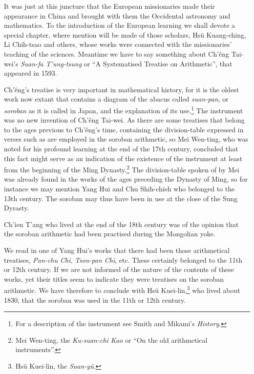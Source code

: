 \documentclass[11pt]{article}
\newcommand{\scanpage}[2]{\clearpage\setcounter{footnote}{0}\noindent{\footnotesize\color{gray}PDF page #1 · #2}\par\medskip}
\newcommand{\scanfooter}{}
\begin{document}
It was just at this juncture that the European missionaries made their appearance in China and brought with them the Occidental astronomy and mathematics. To the introduction of the European learning we shall devote a special chapter, where mention will be made of those scholars, Hsü Kuang-ching, Li Chih-tsao and others, whose works were connected with the missionaries' teaching of the sciences. Meantime we have to say something about Ch'êng Tai-wei's \emph{Suan-fa T'ung-tsung} or ``A Systematised Treatise on Arithmetic'', that appeared in 1593.

Ch'êng's treatise is very important in mathematical history, for it is the oldest work now extant that contains a diagram of the abacus called \emph{suan-pan}, or \emph{soroban} as it is called in Japan, and the explanation of its use.\footnote{For a description of the instrument see Smith and Mikami's \emph{History}.} The instrument was no new invention of Ch'êng Tai-wei. As there are some treatises that belong to the ages previous to Ch'êng's time, containing the division-table expressed in verses such as are employed in the soroban arithmetic, so Mei Wen-ting, who was noted for his profound learning at the end of the 17th century, concluded that this fact might serve as an indication of the existence of the instrument at least from the beginning of the Ming Dynasty.\footnote{Mei Wen-ting, the \emph{Ku-suan-chi Kao} or ``On the old arithmetical instruments''.} The division-table spoken of by Mei was already found in the works of the ages preceding the Dynasty of Ming, so for instance we may mention Yang Hui and Chu Shih-chieh who belonged to the 13th century. The soroban may thus have been in use at the close of the Sung Dyrasty.
\scanfooter

\scanpage{0125}{Chapter 16, printed page 111}
\setcounter{footnote}{0}
Ch'ien T'ang who lived at the end of the 18th century was of the opinion that the soroban arithmetic had been practised during the Mongolian yoke.

We read in one of Yang Hui's works that there had been those arithmetical treatises, \emph{Pan-chu Chi}, \emph{Tsou-pan Chi}, etc. These certainly belonged to the 11th or 12th century. If we are not informed of the nature of the contents of these works, yet their titles seem to indicate they were treatises on the soroban arithmetic. We have therefore to conclude with Hsü Kuei-lin,\footnote{Hsü Kuei-lin, the \emph{Suan-yü}.} who lived about 1830, that the soroban was used in the 11th or 12th century.
\end{document}
